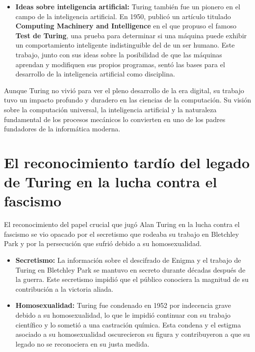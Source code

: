 \documentclass{article}
\begin{document}
\begin{itemize}
    \item \textbf{Ideas sobre inteligencia artificial:} Turing también fue un 
    pionero en el campo de la inteligencia artificial. En 1950, publicó un 
    artículo titulado \textbf{Computing Machinery and Intelligence} en el que propuso 
    el famoso \textbf{Test de Turing}, una prueba para determinar si una máquina 
    puede exhibir un comportamiento inteligente indistinguible del de un ser humano. 
    Este trabajo, junto con sus ideas sobre la posibilidad de que las máquinas aprendan 
    y modifiquen sus propios programas, sentó las bases para el desarrollo de la inteligencia 
    artificial como disciplina.
\end{itemize}

Aunque Turing no vivió para ver el pleno desarrollo de la era digital, su trabajo tuvo 
un impacto profundo y duradero en las ciencias de la computación. Su visión sobre la 
computación universal, la inteligencia artificial y la naturaleza fundamental de los 
procesos mecánicos lo convierten en uno de los padres fundadores de la informática moderna.

\section{El reconocimiento tardío del legado de Turing en la lucha contra el fascismo}

El reconocimiento del papel crucial que jugó Alan Turing en la lucha contra el fascismo 
se vio opacado por el secretismo que rodeaba su trabajo en Bletchley Park y por la 
persecución que sufrió debido a su homosexualidad.

\begin{itemize}
    \item \textbf{Secretismo:} La información sobre el descifrado de Enigma y el 
    trabajo de Turing en Bletchley Park se mantuvo en secreto durante décadas 
    después de la guerra. Este secretismo impidió que el público conociera la 
    magnitud de su contribución a la victoria aliada.
    
    \item \textbf{Homosexualidad:} Turing fue condenado en 1952 por indecencia grave 
    debido a su homosexualidad, lo que le impidió continuar con su trabajo científico y 
    lo sometió a una castración química. Esta condena y el estigma asociado a su 
    homosexualidad oscurecieron su figura y contribuyeron a que su legado no se 
    reconociera en su justa medida.
\end{itemize}
\end{document}
